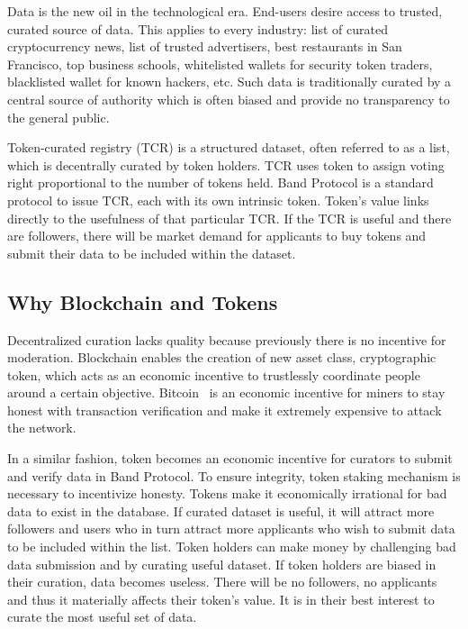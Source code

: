 \documentclass[letterpaper,11pt]{article}
\begin{document}
Data is the new oil in the technological era. End-users desire access to trusted, curated source of data. This applies to every industry: list of curated cryptocurrency news, list of trusted advertisers, best restaurants in San Francisco, top business schools, whitelisted wallets for security token traders, blacklisted wallet for known hackers, etc. Such data is traditionally curated by a central source of authority which is often biased and provide no transparency to the general public.

Token-curated registry (TCR) is a structured dataset, often referred to as a list, which is decentrally curated by token holders. TCR uses token to assign voting right proportional to the number of tokens held. Band Protocol is a standard protocol to issue TCR, each with its own intrinsic token. Token's value links directly to the usefulness of that particular TCR. If the TCR is useful and there are followers, there will be market demand for applicants to buy tokens and submit their data to be included within the dataset. 

\subsection{Why Blockchain and Tokens}

Decentralized curation lacks quality because previously there is no incentive for moderation. Blockchain enables the creation of new asset class, cryptographic token, which acts as an economic incentive to trustlessly coordinate people around a certain objective. Bitcoin~\cite{nakamoto} is an economic incentive for miners to stay honest with transaction verification and make it extremely expensive to attack the network. 

In a similar fashion, token becomes an economic incentive for curators to submit and verify data in Band Protocol. To ensure integrity, token staking mechanism is necessary to incentivize honesty. Tokens make it economically irrational for bad data to exist in the database. If curated dataset is useful, it will attract more followers and users who in turn attract more applicants who wish to submit data to be included within the list. Token holders can make money by challenging bad data submission and by curating useful dataset. If token holders are biased in their curation, data becomes useless. There will be no followers, no applicants and thus it materially affects their token's value. It is in their best interest to curate the most useful set of data. 
\end{document}
